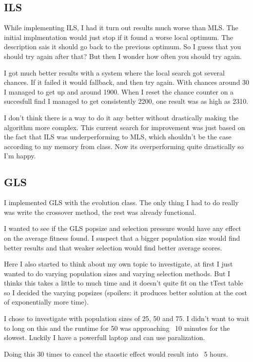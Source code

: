 \documentclass{article}
\begin{document}
\begin{empfile}
\subsection{ILS}
While implementing ILS, I had it turn out results much worse than MLS.
The initial implmentation would just stop if it found a worse local optimum.
The description sais it should go back to the previous optimum. So I guess
that you should try again after that? But then I wonder how often you should
try again.

I got much better results with a system where the local search got several chances.
If it failed it would fallback, and then try again. 
With chances around 30 I managed to get up and around 1900.
When I reset the chance counter on a succesfull find
I managed to get consistently 2200, one result was as high as 2310.

I don't think there is a way to do it any better without drastically making
the algorithm more complex.
This current search for improvement was just based on the fact that ILS was
underperforming to MLS, which shouldn't be the case according to my memory
from class. Now its overperforming quite drastically so I'm happy.

\subsection{GLS}
I implemented GLS with the evolution class. The only thing I had to do really
was write the crossover method, the rest was already functional.

I wanted to see if the GLS popsize and selection pressure would have any
effect on the average fitness found. I suspect that a bigger population size
would find better results and that weaker selection would find better
average scores.

Here I also started to think about my own topic to investigate, at first
I just wanted to do varying population sizes and varying selection methods.
But I thinks this takes a little to much time and it doesn't quite fit
on the tTest table so I decided the varying popsizes (spoilers: it produces
better solution at the cost of exponentially more time).

I chose to investigate with population sizes of 25, 50 and 75. I didn't want
to wait to long on this and the runtime for 50 was approaching ~10 minutes
for the slowest. Luckily I have a powerfull laptop and can use paralization.

Doing this 30 times to cancel the staostic effect would result into ~5 hours.


\end{empfile}
\end{document}
